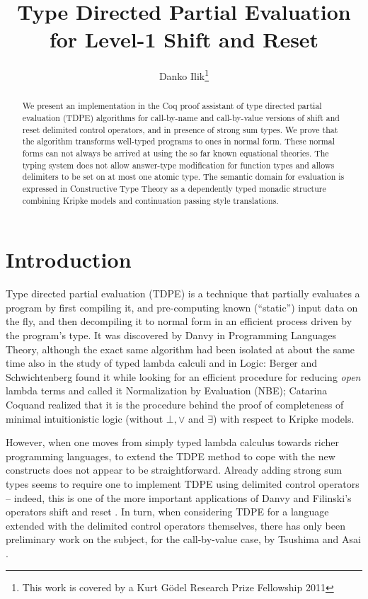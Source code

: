 \documentclass{eptcs}
\title{Type Directed Partial Evaluation for Level-1 Shift and Reset}
\author{Danko Ilik\thanks{This work is covered by a Kurt G\"odel Research Prize Fellowship 2011}
  \institute{Laboratory for Complex Systems and Networks\\Macedonian Academy of Sciences and Arts\\Skopje, Macedonia}
  \email{danko.ilik@gmail.com}
}
\theoremstyle{definition}
\theoremstyle{plain}
\theoremstyle{remark}
\begin{document}
\maketitle

\begin{abstract} 
  We present an implementation in the Coq proof assistant of type
  directed partial evaluation (TDPE) algorithms for call-by-name and
  call-by-value versions of shift and reset delimited control
  operators, and in presence of strong sum types. We prove that the
  algorithm transforms well-typed programs to ones in normal
  form. These normal forms can not always be arrived at using the so
  far known equational theories. The typing system does not allow
  answer-type modification for function types and allows delimiters to
  be set on at most one atomic type. The semantic domain for
  evaluation is expressed in Constructive Type Theory as a dependently
  typed monadic structure combining Kripke models and continuation
  passing style translations.  
\end{abstract}


\section{Introduction}

Type directed partial evaluation (TDPE) is a technique that partially evaluates a program by first compiling it, and pre-computing known (``static'') input data on the fly, and then decompiling it to normal form in an efficient process driven by the program's type. It was discovered by Danvy \cite{Danvy1999} in Programming Languages Theory, although the exact same algorithm had been isolated at about the same time also in the study of typed lambda calculi and in Logic: Berger and Schwichtenberg \cite{BergerS1991} found it while looking for an efficient procedure for reducing \emph{open} lambda terms and called it Normalization by Evaluation (NBE); Catarina Coquand \cite{CCoquand1993} realized that it is the procedure behind the proof of completeness of minimal intuitionistic logic (without $\bot, \vee$ and $\exists$) with respect to Kripke models.

However, when one moves from simply typed lambda calculus towards richer programming languages, to extend the TDPE method to cope with the new constructs does not appear to be straightforward. Already adding strong sum types seems to require one to implement TDPE using delimited control operators -- indeed, this is one of the more important applications of Danvy and Filinski's operators shift and reset \cite{DanvyF1990}. In turn, when considering TDPE for a language extended with the delimited control operators themselves, there has only been preliminary work on the subject, for the call-by-value case, by Tsushima and Asai \cite{TsushimaAsai2009}.
\end{document}
